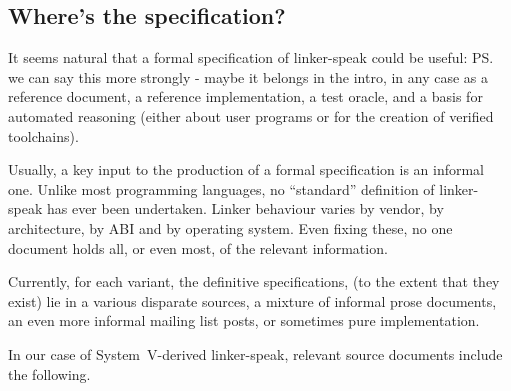 

\subsection{Where's the specification?}

It seems natural that a formal specification of linker-speak
could be useful: 
\ps{we can say this more strongly - maybe it belongs in the intro, in
  any case}
as a reference document, a reference implementation, a test oracle, 
and a basis for automated reasoning (either about user programs or 
for the creation of verified toolchains).

Usually, a key input to the production of a formal specification is an informal one.
Unlike most programming languages, no ``standard'' definition of linker-speak has ever been undertaken.
Linker behaviour varies by  vendor, by architecture, by ABI and by operating system.
Even fixing these, no one document holds all, or even most, of the relevant information.

Currently, for each variant, the definitive specifications,
(to the extent that they exist)
lie in a various disparate sources, 
a mixture of informal prose documents, 
an even more informal mailing list posts, 
or sometimes pure implementation.


In our case of System~V-derived linker-speak, 
relevant source documents include the following.

